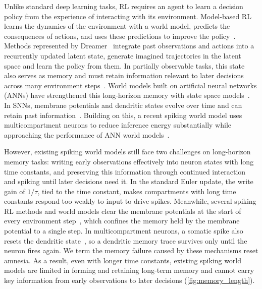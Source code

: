 Unlike standard deep learning tasks, RL requires an agent to learn a decision policy from the experience of interacting with its environment.
Model-based RL learns the dynamics of the environment with a world model, predicts the consequences of actions, and uses these predictions to improve the policy~\cite{ha2018world,hafner2019planet}.
Methods represented by Dreamer~\cite{hafner2020dreamer,hafner2025dreamerv3} integrate past observations and actions into a recurrently updated latent state, generate imagined trajectories in the latent space and learn the policy from them.
In partially observable tasks, this state also serves as memory and must retain information relevant to later decisions across many environment steps~\cite{osband2020bsuite,morad2023popgym,pasukonis2023memorymaze}.
World models built on artificial neural networks (ANNs) have strengthened this long-horizon memory with state space models~\cite{deng2023s4wm,samsami2024r2i}.
In SNNs, membrane potentials and dendritic states evolve over time and can retain past information~\cite{bellec2018lsnn,zheng2024dhsnn,zhang2024tclif}.
Building on this, a recent spiking world model uses multicompartment neurons to reduce inference energy substantially while approaching the performance of ANN world models~\cite{sun2025spikingwm}.

However, existing spiking world models still face two challenges on long-horizon memory tasks: writing early observations effectively into neuron states with long time constants, and preserving this information through continued interaction and spiking until later decisions need it.
In the standard Euler update, the write gain of $1/\tau$, tied to the time constant, makes compartments with long time constants respond too weakly to input to drive spikes.
Meanwhile, several spiking RL methods and world models clear the membrane potentials at the start of every environment step~\cite{tang2020popsan,liu2023dsqn,sun2025spikingwm}, which confines the memory held by the membrane potential to a single step.
In multicompartment neurons, a somatic spike also resets the dendritic state~\cite{sun2025spikingwm}, so a dendritic memory trace survives only until the neuron fires again.
We term the memory failure caused by these mechanisms reset amnesia.
As a result, even with longer time constants, existing spiking world models are limited in forming and retaining long-term memory and cannot carry key information from early observations to later decisions (\cref{fig:memory_length}).

